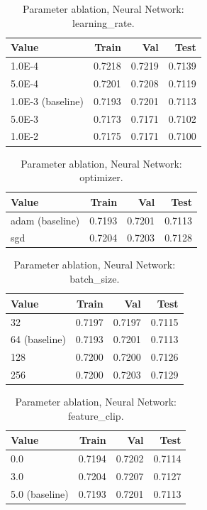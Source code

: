 \begin{table}[ht]
\centering
\small
\caption{Parameter ablation, Neural Network: learning\_rate.}
\label{tab:ablation-neural-learning-rate}
\begin{tabular}{lrrr}
\toprule
Value & Train & Val & Test \\
\midrule
1.0E-4 & 0.7218 & 0.7219 & 0.7139 \\
5.0E-4 & 0.7201 & 0.7208 & 0.7119 \\
1.0E-3 (baseline) & 0.7193 & 0.7201 & 0.7113 \\
5.0E-3 & 0.7173 & 0.7171 & 0.7102 \\
1.0E-2 & 0.7175 & 0.7171 & 0.7100 \\
\bottomrule
\end{tabular}
\end{table}

\begin{table}[ht]
\centering
\small
\caption{Parameter ablation, Neural Network: optimizer.}
\label{tab:ablation-neural-optimizer}
\begin{tabular}{lrrr}
\toprule
Value & Train & Val & Test \\
\midrule
adam (baseline) & 0.7193 & 0.7201 & 0.7113 \\
sgd & 0.7204 & 0.7203 & 0.7128 \\
\bottomrule
\end{tabular}
\end{table}

\begin{table}[ht]
\centering
\small
\caption{Parameter ablation, Neural Network: batch\_size.}
\label{tab:ablation-neural-batch-size}
\begin{tabular}{lrrr}
\toprule
Value & Train & Val & Test \\
\midrule
32 & 0.7197 & 0.7197 & 0.7115 \\
64 (baseline) & 0.7193 & 0.7201 & 0.7113 \\
128 & 0.7200 & 0.7200 & 0.7126 \\
256 & 0.7200 & 0.7203 & 0.7129 \\
\bottomrule
\end{tabular}
\end{table}

\begin{table}[ht]
\centering
\small
\caption{Parameter ablation, Neural Network: feature\_clip.}
\label{tab:ablation-neural-feature-clip}
\begin{tabular}{lrrr}
\toprule
Value & Train & Val & Test \\
\midrule
0.0 & 0.7194 & 0.7202 & 0.7114 \\
3.0 & 0.7204 & 0.7207 & 0.7127 \\
5.0 (baseline) & 0.7193 & 0.7201 & 0.7113 \\
\bottomrule
\end{tabular}
\end{table}

